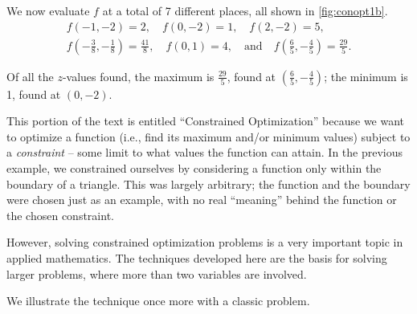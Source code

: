 {%


We now evaluate $f$ at a total of 7 different places, all shown in \autoref{fig:conopt1b}.
\begin{multline*}
 f(-1,-2)=2,\quad f(0,-2)=1,\quad f(2,-2)=5,\\
 f(-\frac38,-\frac18)=\frac{41}8,\quad
 f(0,1)=4,\quad\text{and}\quad f(\frac65,-\frac45)=\frac{29}5.
\end{multline*}

Of all the $z$-values found, the maximum is $\frac{29}5$, found at $(\frac65,-\frac45)$; the minimum is 1, found at $(0,-2)$.}

This portion of the text is entitled ``Constrained Optimization'' because we want to optimize a function (i.e., find its maximum and/or minimum values) subject to a \textit{constraint} -- some limit to what values the function can attain. In the previous example, we constrained ourselves by considering a function only within the boundary of a triangle. This was largely arbitrary; the function and the boundary were chosen just as an example, with no real ``meaning'' behind the function or the chosen constraint.

However, solving constrained optimization problems is a very important topic in applied mathematics. The techniques developed here are the basis for solving larger problems, where more than two variables are involved.

We illustrate the technique once more with a classic problem.

